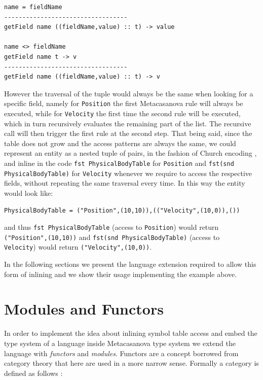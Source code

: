\begin{lstlisting}
name = fieldName
----------------------------------
getField name ((fieldName,value) :: t) -> value

name <> fieldName
getField name t -> v
----------------------------------
getField name ((fieldName,value) :: t) -> v
\end{lstlisting}

\noindent
However the traversal of the tuple would always be the same when looking for a specific field, namely for \texttt{Position} the first Metacasanova rule will always be executed, while for \texttt{Velocity} the first time the second rule will be executed, which in turn recursively evaluates the remaining part of the list. The recursive call will then trigger the first rule at the second step. That being said, since the table does not grow and the access patterns are always the same, we could represent an entity as a nested tuple of pairs, in the fashion of Church encoding \cite{pierce2002types, kleene1935theory}, and inline in the code \texttt{fst PhysicalBodyTable} for \texttt{Position} and \texttt{fst(snd PhysicalBodyTable)} for \texttt{Velocity} whenever we require to access the respective fields, without repeating the same traversal every time. In this way the entity would look like:

\begin{lstlisting}
PhysicalBodyTable = ("Position",(10,10)),(("Velocity",(10,0)),())
\end{lstlisting}

\noindent
and thus \texttt{fst PhysicalBodyTable} (access to \texttt{Position}) would return\\ \texttt{("Position",(10,10))} and \texttt{fst(snd PhysicalBodyTable)} (access to\\ \texttt{Velocity}) would return \texttt{("Velocity",(10,0))}.

In the following sections we present the language extension required to allow this form of inlining and we show their usage implementing the example above.

\section{Modules and Functors}
\label{sec:ch_functors_modules_functors}
In order to implement the idea about inlining symbol table access and embed the type system of a language inside Metacasanova type system we extend the language with \textit{functors} and \textit{modules}. Functors are a concept borrowed from category theory that here are used in a more narrow sense. Formally a category is defined as follows \cite{asperti1991categories, mitchell1965theory, pierce1991basic}:

